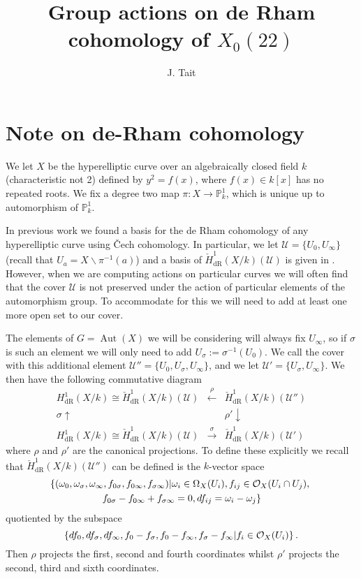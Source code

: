 \documentclass[draft, 11pt]{article} %
\title{Group actions on de Rham cohomology of $X_0(22)$}
\author{J. Tait}
\theoremstyle{plain}
\theoremstyle{remark}
\newcommand{\cO}{{\cal O}}
\newcommand{\ra}{\rightarrow}
\newcommand{\cU}{{\mathcal U}}
\newcommand{\cech}{\v{C}ech }
\newcommand{\derhamhone}{H_{\text {dR}}^1(X/k)}
\newcommand{\cechderhamhone}{\check{H}_{\text {dR}}^1(X/k)}
\DeclareMathOperator{\aut}{Aut}
\begin{document}
\maketitle
\listoftodos
\bigskip

\section{Note on de-Rham cohomology}
We let $X$ be the hyperelliptic curve over an algebraically closed field $k$ (characteristic not 2) defined by $y^2 = f(x)$, where $f(x) \in k[x]$ has no repeated roots.
We fix a degree two map $\pi \colon X \ra \mathbb P^1_k$, which is unique up to automorphism of $\mathbb P_k^1$.



In previous work we found a basis for the de Rham cohomology of any hyperelliptic curve using \cech cohomology.
In particular, we let $\cU = \{ U_0 , U_\infty\}$ (recall that $U_a = X\backslash \pi^{-1}(a)$) and a basis of $\cechderhamhone(\cU)$ is given in \cite{derhamactions}.
However, when we are computing actions on particular curves we will often find that the cover $\cU$ is not preserved under the action of particular elements of the automorphism group.
To accommodate for this we will need to add at least one more open set to our cover.


The elements of $G= \aut(X)$ we will be considering will always fix $U_\infty$, so if $\sigma$ is such an element we will only need to add $U_\sigma := \sigma^{-1}(U_0)$.
We call the cover with this additional element $\cU'' = \{U_0, U_\sigma, U_\infty \}$, and we let $\cU' = \{U_\sigma, U_\infty\}$.
We then have the following commutative diagram
\[
\begin{array}{ccc}
\derhamhone \cong \cechderhamhone(\cU)  & \xleftarrow{\rho} & \cechderhamhone(\cU'')  \\
\sigma\uparrow & ~ & \rho'\downarrow  \\
\derhamhone \cong \cechderhamhone(\cU)  & \xrightarrow{\sigma} & \cechderhamhone(\cU')
\end{array}
\]
where $\rho$ and $\rho'$ are the canonical projections.
To define these explicitly we recall that $\cechderhamhone(\cU'')$ can be defined is the $k$-vector space 
\begin{multline}\label{sixtupleconditions}
\left\{ (\omega_0, \omega_\sigma, \omega_\infty , f_{0\sigma}, f_{0 \infty},f_{\sigma \infty}) | \omega_i \in \Omega_X(U_i), f_{ij} \in \cO_X(U_i \cap U_j), \right. \\ \left. f_{0\sigma} - f_{0\infty} + f_{\sigma \infty} = 0, df_{ij} = \omega_i - \omega_j \right\}
\end{multline}
quotiented by the subspace 
\[
\left\{ df_0, df_\sigma, df_\infty, f_0- f_\sigma, f_0 - f_\infty, f_\sigma - f_\infty | f_i \in \cO_X(U_i)\right\}.
\]
Then $\rho$ projects the first, second and fourth coordinates whilst $\rho'$ projects the second, third and sixth coordinates.
\end{document}
